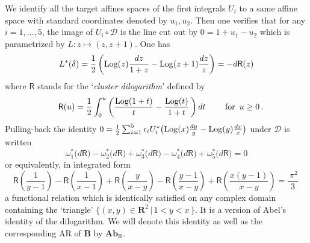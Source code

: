 \documentclass[11pt]{amsart}
\begin{document}
We identify all the target affines spaces of the first integrals $U_i$ to a same 
affine space with standard coordinates denoted by $u_1,u_2$. 
Then one verifies that for any $i=1,\ldots,5$, the image of $  U_i\circ \mathcal D$ is the  line cut out by 
$0= 1+u_1-u_2$
which is parametrized by $L: z\mapsto (z,z+1)$. One has 
$$
L^*(\delta)=\frac{1}{2}\left( 
{\rm Log}(z) \frac{dz}{1+z}-
{\rm Log}(z+1) \frac{dz}{z}
\right) = - d {\mathsf R}(z) 
$$
where ${\mathsf  R}$ stands for the `{\it cluster dilogarithm}' defined by 
$$
{}^{} \quad 
{\mathsf  R}(u)=\frac{1}{2} \int_{0}^u 
\left( 
 \frac{{\rm Log}(1+t)}{t}
-  \frac{{\rm Log}(t)}{1+t}\,
\right) dt  \qquad \mbox{ for } \, u\geq 0\, .
$$
Pulling-back the identity $0=\frac{1}{2} \sum_{i=1}^5 \epsilon_i U_i^*
\big( 
{\rm Log}(x) \frac{dy}{y}-
{\rm Log}(y) \frac{dx}{x}\big)$ under $\mathcal D$ is written 
$$
\omega_1^*\big( d{\mathsf  R}\big)
-\omega_2^*\big( d{\mathsf  R}\big)+\omega_3^*\big( d{\mathsf  R}\big)
-\omega_4^*\big( d{\mathsf  R}\big)+\omega_5^*\big( d{\mathsf  R}\big)=0 
$$
or equivalently, in integrated form
\begin{equation}
\label{Eq:5-terms-R-cluster}
{\mathsf  R} \left( \frac{1}{y -1}  \right) 
-{\mathsf  R} \left( \frac{1}{x -1}  \right) 
+{\mathsf  R} \left( \frac{y}{x -y}  \right) 
-{\mathsf  R} \left( \frac{y -1}{x-y} \right) 
+{\mathsf  R} \left( \frac{x(y -1)}{x -y} \right) = \frac{{}^{}\, \pi^2}{3}\, 
\end{equation}
a functional relation which is identically satisfied on any complex domain containing the `triangle' $\{ (x,y)\in \mathbf R^2\, \big\lvert \, 1<y<x\, \}$. It is a version of Abel's identity of the dilogarithm. We will denote this identity as well as the corresponding AR of $\boldsymbol{B}$ by $\boldsymbol{Ab}_{\mathrm R}$. 
\end{document}
